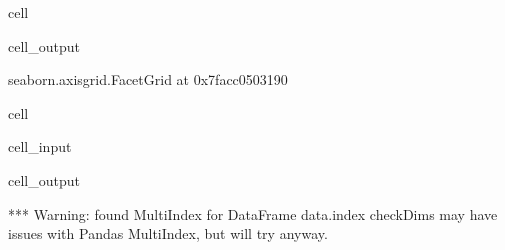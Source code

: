 \documentclass[letterpaper,table,10pt,english]{jupyterBook}
\begin{document}
\begin{sphinxuseclass}{cell}
\begin{sphinxVerbatimOutput}
\begin{sphinxuseclass}{cell_output}
\begin{sphinxVerbatim}[commandchars=\\\{\}]
\PYGZlt{}seaborn.axisgrid.FacetGrid at 0x7facc0503190\PYGZgt{}
\end{sphinxVerbatim}

\noindent{}

\end{sphinxuseclass}\end{sphinxVerbatimOutput}

\end{sphinxuseclass}
\begin{sphinxuseclass}{cell}\begin{sphinxVerbatimInput}

\begin{sphinxuseclass}{cell_input}
\begin{sphinxVerbatim}[commandchars=\\\{\}]
   
       
                      
\end{sphinxVerbatim}

\end{sphinxuseclass}\end{sphinxVerbatimInput}
\begin{sphinxVerbatimOutput}

\begin{sphinxuseclass}{cell_output}
\begin{sphinxVerbatim}[commandchars=\\\{\}]
*** Warning: found MultiIndex for DataFrame data.index \PYGZhy{} checkDims may have issues with Pandas MultiIndex, but will try anyway.
\end{sphinxVerbatim}


\end{sphinxuseclass}
\end{sphinxVerbatimOutput}
\end{sphinxuseclass}
\end{document}

